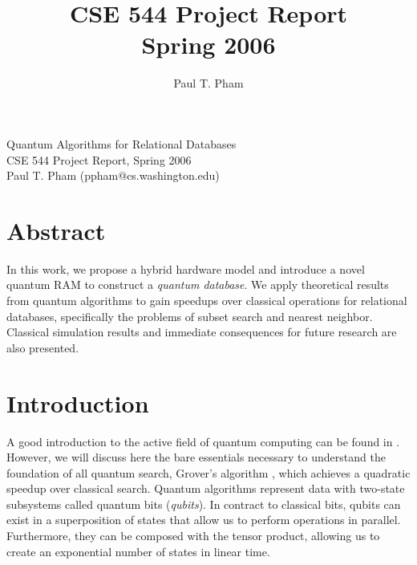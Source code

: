 \documentclass{toc}
\title{CSE 544 Project Report\\Spring 2006}
\author{Paul T. Pham}
\theoremstyle{plain}
\theoremstyle{definition}
\begin{document}
\newcommand{\braket}[2]{\langle #1|#2 \rangle}
\newcommand{\normtwo}{\frac{1}{\sqrt{2}}}

\begin{center}
\LARGE{Quantum Algorithms for Relational Databases}\\
\Large{CSE 544 Project Report, Spring 2006}\\
\Large{Paul T. Pham (ppham@cs.washington.edu)}
\end{center}

\section{Abstract}

In this work, we propose a hybrid hardware model and
introduce a novel quantum RAM to construct
a \textit{quantum database}.
We apply theoretical results from quantum algorithms to gain speedups over
classical operations for relational databases,
specifically the problems of subset search and nearest neighbor.
Classical simulation results and immediate consequences for future research
are also presented.

\section{Introduction}


A good introduction to the active field of quantum computing
can be found in \cite{nc00}. However, we will discuss here the bare essentials
necessary to understand the foundation of all quantum search,
Grover's algorithm \cite{grover98}, which
achieves a quadratic speedup over classical search.
Quantum algorithms represent data with two-state subsystems called
quantum bits (\textit{qubits}). In contract to classical bits,
qubits can exist in a superposition of states that allow us to perform
operations in parallel.
Furthermore, they can be composed with the tensor
product, allowing us to create an exponential number of states in linear time. 
\end{document}
